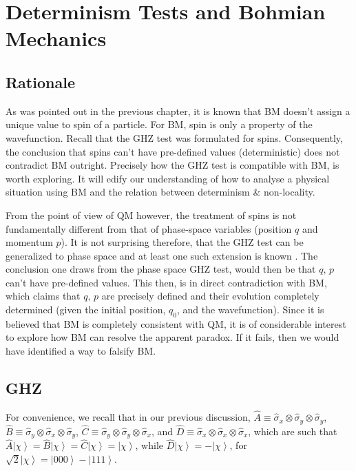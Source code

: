 %

\chapter{Determinism Tests and Bohmian Mechanics}


\section{Rationale}

As was pointed out in the previous chapter, it is known that BM doesn't
assign a unique value to spin of a particle. For BM, spin is only
a property of the wavefunction. Recall that the GHZ test was formulated
for spins. Consequently, the conclusion that spins can't have pre-defined
values (deterministic) does not contradict BM outright. Precisely
how the GHZ test is compatible with BM, is worth exploring. It will
edify our understanding of how to analyse a physical situation using
BM and the relation between determinism \& non-locality. 

From the point of view of QM however, the treatment of spins is not
fundamentally different from that of phase-space variables (position
$q$ and momentum $p$). It is not surprising therefore, that the
GHZ test can be generalized to phase space and at least one such extension
is known \cite{GHZcontinuous}. The conclusion one draws from the
phase space GHZ test, would then be that $q,\,p$ can't have pre-defined
values. This then, is in direct contradiction with BM, which claims
that $q,\,p$ are precisely defined and their evolution completely
determined (given the initial position, $q_{0}$, and the wavefunction).
Since it is believed that BM is completely consistent with QM, it
is of considerable interest to explore how BM can resolve the apparent
paradox. If it fails, then we would have identified a way to falsify
BM.

\section{GHZ}

For convenience, we recall that in our previous discussion, $\hat{A}\equiv\hat{\sigma}_{x}\otimes\hat{\sigma}_{y}\otimes\hat{\sigma}_{y}$,
$\hat{B}\equiv\hat{\sigma}_{y}\otimes\hat{\sigma}_{x}\otimes\hat{\sigma}_{y}$,
$\hat{C}\equiv\hat{\sigma}_{y}\otimes\hat{\sigma}_{y}\otimes\hat{\sigma}_{x}$,
and $\hat{D}\equiv\hat{\sigma}_{x}\otimes\hat{\sigma}_{x}\otimes\hat{\sigma}_{x}$,
which are such that $\hat{A}\left|\chi\right\rangle =\hat{B}\left|\chi\right\rangle =\hat{C}\left|\chi\right\rangle =\left|\chi\right\rangle $,
while $\hat{D}\left|\chi\right\rangle =-\left|\chi\right\rangle $,
for $\sqrt{2}\left|\chi\right\rangle =\left|000\right\rangle -\left|111\right\rangle $.


